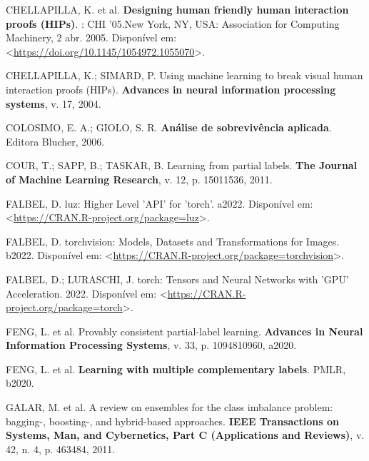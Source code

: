 \documentclass[12pt,twoside,brazilian]{book}
\newlength{\cslhangindent}
\newlength{\cslentryspacingunit} %
\newenvironment{CSLReferences}[2] %
 {%
  \setlength{\parindent}{0pt}
  \ifodd #1
  \let\oldpar\par
  \def\par{\hangindent=\cslhangindent\oldpar}
  \fi
  \setlength{\parskip}{#2\cslentryspacingunit}
 }%
 {}
\begin{document}
\begin{CSLReferences}{0}{1}
\leavevmode{}%
CHELLAPILLA, K. et al. \textbf{Designing human friendly human
interaction proofs (HIPs)}. : CHI '05.New York, NY, USA: Association for
Computing Machinery, 2 abr. 2005. Disponível em:
\textless{}\url{https://doi.org/10.1145/1054972.1055070}\textgreater.

\leavevmode{}%
CHELLAPILLA, K.; SIMARD, P. Using machine learning to break visual human
interaction proofs (HIPs). \textbf{Advances in neural information
processing systems}, v. 17, 2004.

\leavevmode{}%
COLOSIMO, E. A.; GIOLO, S. R. \textbf{Análise de sobrevivência
aplicada}. Editora Blucher, 2006.

\leavevmode{}%
COUR, T.; SAPP, B.; TASKAR, B. Learning from partial labels. \textbf{The
Journal of Machine Learning Research}, v. 12, p. 15011536, 2011.

\leavevmode{}%
FALBEL, D. luz: Higher Level 'API' for 'torch'. a2022. Disponível em:
\textless{}\url{https://CRAN.R-project.org/package=luz}\textgreater.

\leavevmode{}%
FALBEL, D. torchvision: Models, Datasets and Transformations for Images.
b2022. Disponível em:
\textless{}\url{https://CRAN.R-project.org/package=torchvision}\textgreater.

\leavevmode{}%
FALBEL, D.; LURASCHI, J. torch: Tensors and Neural Networks with 'GPU'
Acceleration. 2022. Disponível em:
\textless{}\url{https://CRAN.R-project.org/package=torch}\textgreater.

\leavevmode{}%
FENG, L. et al. Provably consistent partial-label learning.
\textbf{Advances in Neural Information Processing Systems}, v. 33, p.
1094810960, a2020.

\leavevmode{}%
FENG, L. et al. \textbf{Learning with multiple complementary labels}.
PMLR, b2020.

\leavevmode{}%
GALAR, M. et al. A review on ensembles for the class imbalance problem:
bagging-, boosting-, and hybrid-based approaches. \textbf{IEEE
Transactions on Systems, Man, and Cybernetics, Part C (Applications and
Reviews)}, v. 42, n. 4, p. 463484, 2011.


\end{CSLReferences}
\end{document}
